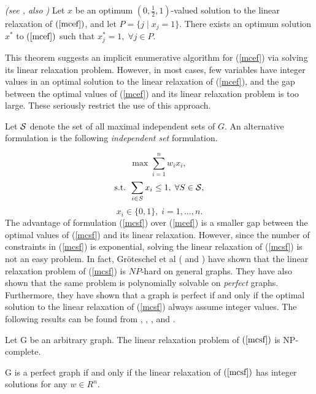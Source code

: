 \begin{thm}
{\em (see \cite{NeTr75}, also \cite{PiQu77})}
Let $x$ be an optimum $(0, \frac{1}{2}, 1)$-valued solution to the
linear relaxation of $(\ref{mcef})$, and let
$P = \{j \; | \; x_{j} = 1 \}$. There exists an optimum solution
$x^{*}$ to $(\ref{mcef})$ such that $x^{*}_j = 1, \; \forall j \in  
P$.
	\label{thm01}
\end{thm}

This theorem suggests an implicit enumerative algorithm for
(\ref{mcef}) via solving its linear relaxation problem. However, in
most cases, few variables have integer values in an optimal solution
to the linear relaxation of (\ref{mcef}), and the gap between the
optimal values of (\ref{mcef}) and its linear relaxation problem is
too large. These seriously restrict the use of this approach.

Let $\cal S$ denote the set of all maximal independent sets of $G$.
An alternative formulation is the following {\em independent set}
formulation.

\begin{equation}
\mbox{max } \sum_{i=1}^{n} w_{i} x_{i},
	\label{mcsf}
\end{equation}
\[ \mbox{s.t. } \sum_{i \in S} x_{i} \leq 1, \;
	\forall S \in \cal S, \]
\[ x_{i} \in \{0,1\}, \; i = 1, \ldots, n. \]
The advantage of formulation (\ref{mcsf}) over (\ref{mcef}) is a
smaller gap between the optimal values of (\ref{mcsf}) and its
linear relaxation. However, since the number of constraints in
(\ref{mcsf}) is exponential, solving the linear relaxation of
(\ref{mcsf}) is not an easy problem. In fact, Gr\"{o}teschel et al
(\cite{GrLoSc86} and \cite{GrLoSc88}) have shown that the linear
relaxation problem of
(\ref{mcsf}) is $NP$-hard on general graphs. They have also shown
that the same problem is polynomially solvable on {\em perfect}
graphs. Furthermore, they have shown that a graph is perfect if and
only if the optimal solution to the linear relaxation of
(\ref{mcsf}) always assume integer values. The following results can
be found from \cite{GrLoSc81}, \cite{GrLoSc86}, \cite{GrLoSc88}, and
\cite{GrLoSc89}.

\begin{thm}
Let G be an arbitrary graph. The linear relaxation problem of
$(\ref{mcsf})$ is NP-complete.
	\label{thm02}
\end{thm}

\begin{thm}
G is a perfect graph if and only if the linear relaxation of
$(\ref{mcsf})$ has integer solutions for any $w \in R^{n}$.
	\label{thm03}
\end{thm}

